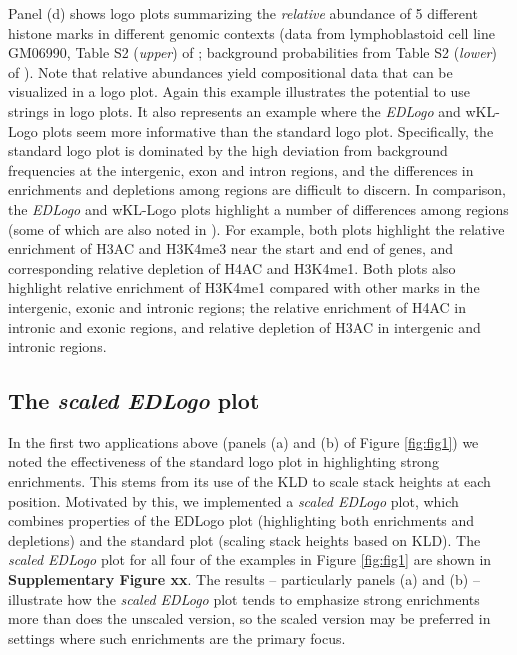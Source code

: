 \documentclass{bmcart}
\begin{document}
Panel (d) shows logo plots summarizing the {\it relative} abundance of 5 different histone marks in different genomic contexts (data from lymphoblastoid cell line GM06990, Table S2 (\textit{upper}) of \cite{Koch2007};
background probabilities from Table S2 (\textit{lower}) of \cite{Koch2007}). Note that relative 
abundances yield compositional data that can be visualized in a logo plot. Again this example
illustrates the potential to use strings in logo plots. It also represents an example where
the \textit{EDLogo} and wKL-Logo plots seem more informative than the standard logo plot.
Specifically, the standard logo plot is dominated by the high deviation from background
frequencies at the intergenic, exon and intron regions, and the differences in enrichments and depletions among regions are difficult to discern. In comparison, 
the \textit{EDLogo} and wKL-Logo plots highlight a number of differences among regions
(some of which are also noted in \cite{Koch2007}). For example, both plots 
highlight the relative enrichment of H3AC and H3K4me3 near the start and end of genes, and corresponding relative depletion of H4AC and H3K4me1. Both plots also highlight relative enrichment of H3K4me1 compared with other marks in the intergenic, exonic and intronic regions; the relative enrichment of H4AC in intronic and exonic regions, 
and relative depletion of H3AC in intergenic and intronic regions.

\subsection*{The \textit{scaled EDLogo} plot}

In the first two applications above (panels (a) and (b) of Figure \ref{fig:fig1}) we noted the effectiveness of the standard logo plot in highlighting strong enrichments. This stems 
from its use of the KLD to scale stack heights at each position.  
Motivated by this, we implemented a \textit{scaled EDLogo} plot,
which combines properties of the EDLogo plot (highlighting both enrichments and depletions) and the standard plot (scaling stack heights based on KLD). The \textit{scaled EDLogo} plot for all four of the examples in Figure \ref{fig:fig1} are
shown in {\bf Supplementary Figure xx}. The results -- particularly panels (a) and (b) -- illustrate how the \textit{scaled EDLogo} plot tends to emphasize strong enrichments more than does the unscaled version, so the scaled version may be preferred in settings
where such enrichments are the primary focus. 
\end{document}
